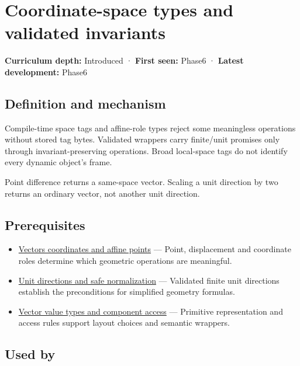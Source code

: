 \hypertarget{appendix-380a220e2529}{}
\section{Coordinate-space types and validated invariants}\label{appendix-380a220e2529-coordinate-space-types-and-validated-invariants}

\textbf{Curriculum depth:} Introduced · \textbf{First seen:} Phase6 · \textbf{Latest development:} Phase6

\subsection{Definition and mechanism}\label{appendix-380a220e2529-definition-and-mechanism}

Compile-time space tags and affine-role types reject some meaningless operations without stored tag bytes. Validated wrappers carry finite/unit promises only through invariant-preserving operations. Broad local-space tags do not identify every dynamic object's frame.

Point difference returns a same-space vector. Scaling a unit direction by two returns an ordinary vector, not another unit direction.

\subsection{Prerequisites}\label{appendix-380a220e2529-prerequisites}

\begin{itemize}
\tightlist
\item
  \hyperref[appendix-0659864c0aa3]{Vectors coordinates and affine points} --- Point, displacement and coordinate roles determine which geometric operations are meaningful.
\item
  \hyperref[appendix-f744e41b95b4]{Unit directions and safe normalization} --- Validated finite unit directions establish the preconditions for simplified geometry formulas.
\item
  \hyperref[appendix-37a39984ba66]{Vector value types and component access} --- Primitive representation and access rules support layout choices and semantic wrappers.
\end{itemize}

\subsection{Used by}\label{appendix-380a220e2529-used-by}

